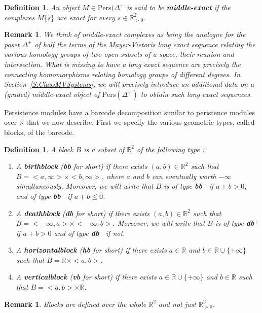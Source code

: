 \documentclass[a4paper, english, 11pt]{article}
\newcommand{\0}{\vec{0}}
\newcommand{\R}[0]{\mathbb{R}}
\newcommand{\Pers}[0]{\text{Pers}}
\newtheorem{remark}[prop]{Remark}
\newtheorem{defi}[prop]{Definition}
\begin{document}
\begin{defi}\label{D:middleexact} An object
$M\in \Pers(\Delta^+$ is said to be \textbf{middle-exact} if the complexes $M\{s\}$ are exact for every $s\in\R^2_{>0} $.
\end{defi}
\begin{remark}
We think of middle-exact complexes as being the analogue for the poset $\Delta^+$ of half the terms of the Mayer-Vietoris long exact sequence relating the various homology groups of two open subsets of a space, their reunion and intersection. What is missing to have a long exact sequence are precisely the connecting homomorphisms relating homology groups of different degrees. In Section~\ref{S:ClassMVSystems}, we will precisely introduce an additional data on a (graded) middle-exact object of $\Pers(\Delta^+)$ to obtain such long exact sequences. 
\end{remark}
Persistence modules have a barcode decomposition similar to peristence modules over $\R$ that we now describe. First we specify the various geometric types, called blocks, of the barcode. 
\begin{defi}\label{def:block_MV}
A block $B$ is a subset of $\R^2$ of the following type : 
\begin{enumerate}
    \item A \textbf{birthblock} (\textbf{bb} for short) if there exists $(a,b)\in \R^2$ such that $B = <a,\infty> \times <b,\infty>$, where $a$ and $b$ can eventually worth $-\infty$ simultaneously. Moreover, we will write that $B$ is of type \textbf{bb$^+$} if $a+b > 0$, and of type \textbf{bb$^-$} if $a+b \leq 0$. 
    \item A \textbf{deathblock} (\textbf{db} for short) if there exists $(a,b)\in \R^2$ such that $B = <-\infty,a> \times <-\infty,b>$. 
    Moreover, we will write that $B$ is of type \textbf{db}$^+$ if  $a+b>0$ and of type \textbf{db$^-$} if not. 
     \item A \textbf{horizontalblock} (\textbf{hb} for short) if there exists $a\in \R$ and $b\in \R\cup \{+\infty\}$ such that $B = \R \times <a,b>$.
     \item A \textbf{verticalblock} (\textbf{vb} for short) if there exists $a\in \R\cup \{+\infty\}$ and $b\in \R$ such that $B = <a,b> \times \R$.
\end{enumerate}
\end{defi}
\begin{remark}
Blocks are defined over the whole $\R^2$ and not just $\R^2_{>0}$.
\end{remark}
\end{document}
